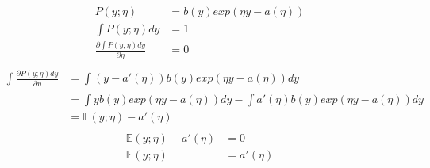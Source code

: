 \begin{answer}
\begin{align*}
    P(y;\eta) &= b(y)exp(\eta y - a(\eta))\\
    \int P(y;\eta) dy &= 1\\
    \frac{\partial \int P(y;\eta) dy}{\partial \eta} &= 0\\
\end{align*}
\begin{align*}
    \int \frac{\partial P(y; \eta) dy}{\partial \eta} &= \int (y - a'(\eta)) b(y) exp(\eta y - a(\eta)) dy\\
    &= \int yb(y) exp(\eta y - a(\eta)) dy - \int a'(\eta) b(y) exp(\eta y - a(\eta)) dy\\
    &= \mathbb{E}(y;\eta) - a'(\eta)\\
\end{align*}
\begin{align*}
    \mathbb{E}(y;\eta) - a'(\eta) &= 0\\
    \mathbb{E}(y;\eta) &= a'(\eta)
\end{align*}
\end{answer}
